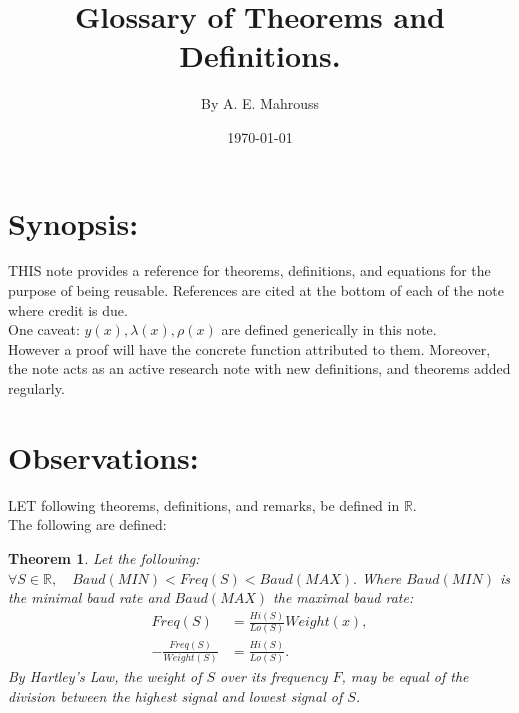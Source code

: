 \documentclass[10pt]{article}
\title{%
	\vspace{-1.5em}%
	\large\textbf{Glossary of Theorems and Definitions.}%
}
\author{By A. E. Mahrouss}
\date{\today}
\theoremstyle{plain}
\newtheorem{theorem}{Theorem}[section]
\theoremstyle{definition}
\theoremstyle{remark}
\begin{document}

\maketitle
\tableofcontents
\newpage

\section{Synopsis:}

\lettrine[lines=2, lhang=0.1, loversize=0.2]{T}HIS note provides a reference for theorems, definitions, and equations for the purpose of being reusable. References are cited at the bottom of each of the note where credit is due.\\
One caveat: $y(x), \lambda(x), \rho(x)$ are defined generically in this note.\\However a proof will have the concrete function attributed to them. Moreover, the note acts as an active research note with new definitions, and theorems added regularly.

\section{Observations:}

\lettrine[lines=1, lhang=0.1, loversize=0.2]{L}ET following theorems, definitions, and remarks, be defined in $\mathbb{R}.$\\The following are defined:

\begin{theorem}
Let the following:
$\forall S \in \mathbb{R}, \quad Baud(MIN) < Freq(S) < Baud(MAX).$ Where $Baud(MIN)$ is the minimal baud rate and $Baud(MAX)$ the maximal baud rate:
\begin{align*}
	Freq(S) &= \frac{Hi(S)}{Lo(S)} Weight(x),\\
	-\frac{Freq(S)}{Weight(S)} &= \frac{Hi(S)}{Lo(S)}.
\end{align*}
By Hartley's Law, the weight of $S$ over its frequency $F$, may be equal of the division between the highest signal and lowest signal of $S$.
\end{theorem}
\end{document}
